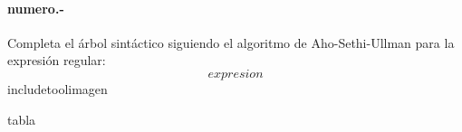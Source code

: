 
\paragraph{{numero}.-}\label{p{numero}}
Completa el árbol sintáctico siguiendo el algoritmo de Aho-Sethi-Ullman para la expresión regular:
\[
    {expresion}
\]
    {includetool}{{imagen}}
    
{tabla}
